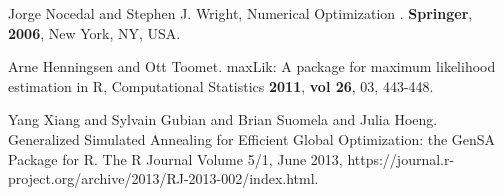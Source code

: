\documentclass[remotesensing,article,submit,moreauthors,pdftex]{Definitions/mdpi}
\begin{document}
\begin{thebibliography}{999}
Jorge Nocedal and Stephen J. Wright, Numerical Optimization . {\bf Springer}, {\bf 2006}, New York, NY, USA.


Arne Henningsen and Ott Toomet. maxLik: A package for maximum likelihood estimation in {R}, Computational Statistics {\bf 2011}, {\bf vol 26}, 03, 443-448.

Yang Xiang and Sylvain Gubian and Brian Suomela and Julia Hoeng. Generalized Simulated Annealing for Efficient Global Optimization: the {GenSA} Package for {R}. The R Journal Volume 5/1, June 2013, https://journal.r-project.org/archive/2013/RJ-2013-002/index.html.

 

\end{thebibliography}





\end{document}
